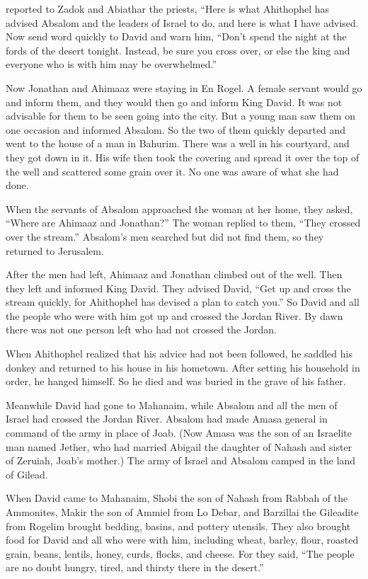 {reported to
Zadok
and Abiathar
the priests,
“Here is what
Ahithophel
has advised Absalom
and the leaders
of Israel
to do, and here is what
I have
advised.
Now
send
word quickly
to David
and warn
him, “Don’t
spend
the night at the fords
of the desert
tonight.
Instead, be sure you cross
over, or else
the king
and everyone
who
is with him may
be overwhelmed.”
\par }{\PP {}Now Jonathan
and Ahimaaz
were staying
in En Rogel.
A female servant
would go
and inform
them, and they
would then go
and inform
King
David.
It was not
advisable
for them to be seen
going
into the city.
But a young man
saw
them on one occasion and informed
Absalom.
So the two
of them quickly
departed
and went
to
the house
of a man
in Bahurim.
There was a well
in his courtyard,
and they got down
in it.
His wife
then took
the covering
and spread
it over
the top of the well
and scattered
some grain
over
it. No
one was aware
of what
she had done.
\par }{\PP {}When the servants
of Absalom
approached
the woman
at her home,
they asked,
“Where
are Ahimaaz
and Jonathan?” The woman
replied
to them, “They crossed over
the stream.”
Absalom’s men searched
but did not
find
them, so they returned
to Jerusalem.
\par }{\PP {}After
the men had left,
Ahimaaz and Jonathan climbed
out of the well.
Then they left
and informed
King
David.
They advised
David,
“Get
up and cross
the
stream
quickly,
for
Ahithophel
has devised
a plan to catch you.”
So David
and all
the people
who
were with
him got up
and crossed
the Jordan River.
By
dawn
there was not
one
person left
who had
not
crossed
the Jordan.
\par }{\PP {}When
Ahithophel
realized
that
his advice
had
not
been followed, he
saddled
his donkey
and
returned
to
his house
in
his hometown.
After setting
his household
in order, he hanged
himself. So he died
and was buried
in the grave
of his father.
\par }{\PP {}Meanwhile David
had gone
to Mahanaim,
while Absalom
and all
the men
of Israel
had crossed
the Jordan River.
Absalom
had made
Amasa
general in command of the army
in place of
Joab.
(Now Amasa
was the son
of an Israelite
man
named
Jether,
who had
married
Abigail
the daughter
of Nahash
and sister
of Zeruiah,
Joab’s
mother.)
The army of Israel
and Absalom
camped
in the land
of Gilead.
\par }{\PP {}When
David
came
to Mahanaim,
Shobi
the son
of Nahash
from Rabbah
of the Ammonites,
Makir
the son
of Ammiel
from Lo Debar,
and Barzillai
the Gileadite
from Rogelim
brought bedding,
basins,
and pottery
utensils.
They also brought food for David and all who were with him, including wheat,
barley,
flour,
roasted grain,
beans,
lentils,
honey,
curds,
flocks,
and cheese.
For
they said,
“The people
are no doubt hungry,
tired,
and thirsty
there in the desert.”

}
